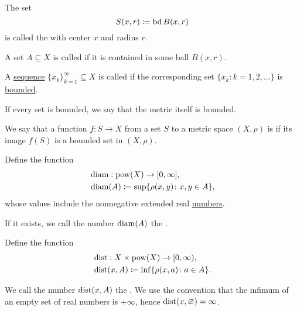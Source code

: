 \begin{Definition}
\begin{DefEnum}
     The set
    \begin{equation*}
      S(x, r) \coloneqq \operatorname{bd}{B(x, r)}
    \end{equation*}
    is called the  with center \( x \) and radius \( r \).

     A set \( A \subseteq X \) is called  if it is contained in some ball \( B(x, r) \).

     A \hyperref[def:sequence]{sequence} \( \{ x_k \}_{k=1}^\infty \subseteq X \) is called  if the corresponding set \( \{ x_k \colon k = 1, 2, \ldots \} \) is \hyperref[def:metric_space/bounded_set]{bounded}.

     If every set is bounded, we say that the metric itself is bounded.

     We say that a function \( f: S \to X \) from a set \( S \) to a metric space \( (X, \rho) \) is  if its image \( f(S) \) is a bounded set in \( (X, \rho) \).

     Define the function
    \begin{align*}
      &\operatorname{diam}: \operatorname{pow}(X) \to [0, \infty], \\
      &\operatorname{diam}(A) \coloneqq \sup \{ \rho(x, y) \colon x, y \in A \},
    \end{align*}
    whose values include the nonnegative extended real \hyperref[def:extended_real_numbers]{numbers}.

    If it exists, we call the number \( \operatorname{diam}(A) \) the .

     Define the function
    \begin{align*}
      &\operatorname{dist}: X \times \operatorname{pow}(X) \to [0, \infty), \\
      &\operatorname{dist}(x, A) \coloneqq \inf \{ \rho(x, a) \colon a \in A \}.
    \end{align*}

    We call the number \( \operatorname{dist}(x, A) \) the . We use the convention that the infimum of an empty set of real numbers is \( +\infty \), hence \( \operatorname{dist}(x, \varnothing) = \infty \).
  \end{DefEnum}
\end{Definition}

